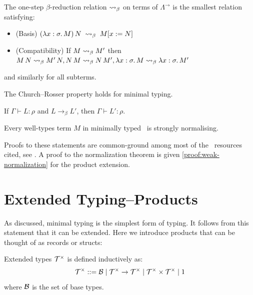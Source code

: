 \begin{definition}
\label{def:one-step-beta}
\leavevmode
The one-step $\beta$-reduction relation $\mathrel{\leadsto}_\beta$ on terms of $\Lambda^\to$ is the smallest relation satisfying:
\begin{itemize}
\item (Basis)
  \(
    (\lambda x : \sigma.\, M)\,N \;\mathrel{\leadsto}_\beta\; M[x := N]
  \)
  \item (Compatibility) If \(M \mathrel{\leadsto}_\beta M'\) then
  \(
    M\,N \mathrel{\leadsto}_\beta M'\,N,
    N\,M \mathrel{\leadsto}_\beta N\,M',
    \lambda x : \sigma.\,M \mathrel{\leadsto}_\beta \lambda x : \sigma.\,M'
  \)
\end{itemize}
and similarly for all subterms.
\end{definition}

\begin{theorem}
\label{thm:church-rosser}
The Church–Rosser property holds for minimal typing.
\end{theorem}

\begin{lemma}
\label{lem:subject-reduction}
If \(\Gamma \vdash L : \rho\) and \(L \to_\beta L'\), then
\(
  \Gamma \vdash L' : \rho.
\)
\end{lemma}

\begin{theorem}
\label{thm:strong-normalisation}
Every well-types term \( M \) in minimally typed \lcalc \ is strongly normalising.
\end{theorem}

\begin{remark}
  Proofs to these statements are common-ground among most of the \lcalc \ resources cited, see \cite{nederpelt2014:type-theory}. A proof to the normalization theorem is given \ref{proof:weak-normalization} for the product extension.
\end{remark}
\section{\centering Extended Typing--Products}
As discussed, minimal typing is the simplest form of typing. It follows from this statement that it can be extended. Here we introduce products that can be thought of as records or structs:

\begin{definition} Extended types $ \mathcal{T}^\times $ is defined inductively as:
\[
  \mathcal{T}^\times ::= \mathcal{B} \mid \mathcal{T}^\times \to \mathcal{T}^\times \mid \mathcal{T}^\times \times \mathcal{T}^\times \mid 1
\]
where $\mathcal{B}$ is the set of base types.
\end{definition}


